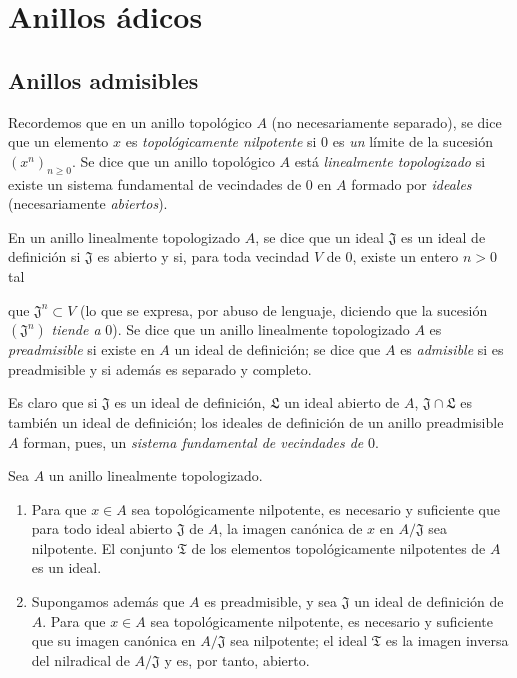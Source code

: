 \section{Anillos ádicos}
\label{section:0.7-fr}

\subsection{Anillos admisibles}
\label{subsection:0.7.1-fr}

\begin{env}[7.1.1]
\label{0.7.1.1-fr}
Recordemos que en un anillo topológico $A$ (no necesariamente separado), se
dice que un elemento $x$ es \emph{topológicamente nilpotente} si $0$ es \emph{un} límite de
la sucesión $(x^n)_{n\geq0}$. Se dice que un anillo topológico $A$ está
\emph{linealmente topologizado} si existe un sistema fundamental de vecindades de
$0$ en $A$ formado por \emph{ideales} (necesariamente \emph{abiertos}).
\end{env}

\begin{definition}[7.1.2]
\label{0.7.1.2-fr}
En un anillo linealmente topologizado $A$, se dice que un ideal $\mathfrak J$
es un \textup{ideal de definición} si $\mathfrak J$ es abierto y si, para toda
vecindad $V$ de $0$, existe un entero $n>0$ tal


que $\mathfrak J^n\subset V$ \textup{(lo que se expresa, por abuso de lenguaje, diciendo
que la sucesión $(\mathfrak J^n)$ \emph{tiende a} $0$)}. Se dice que un anillo linealmente
topologizado $A$ es \emph{preadmisible} si existe en $A$ un ideal de definición;
se dice que $A$ es \emph{admisible} si es preadmisible y si además es
separado y completo.
\end{definition}

Es claro que si $\mathfrak J$ es un ideal de definición, $\mathfrak L$ un
ideal abierto de $A$, $\mathfrak J\cap\mathfrak L$ es también un ideal de
definición; los ideales de definición de un anillo preadmisible $A$ forman,
pues, un \emph{sistema fundamental de vecindades de} $0$.

\begin{lemma}[7.1.3]
\label{0.7.1.3-fr}
Sea $A$ un anillo linealmente topologizado.
\begin{enumerate}
  \item[{\upshape(i)}] Para que $x\in A$ sea topológicamente nilpotente, es
    necesario y suficiente que para todo ideal abierto $\mathfrak J$ de $A$, la imagen
    canónica de $x$ en $A/\mathfrak J$ sea nilpotente. El conjunto
    $\mathfrak T$ de los elementos topológicamente nilpotentes de $A$ es un ideal.
  \item[{\upshape(ii)}] Supongamos además que $A$ es preadmisible, y sea
    $\mathfrak J$ un ideal de definición de $A$. Para que $x\in A$ sea
    topológicamente nilpotente, es necesario y suficiente que su imagen canónica en
    $A/\mathfrak J$ sea nilpotente; el ideal $\mathfrak T$ es la imagen
    inversa del nilradical de $A/\mathfrak J$ y es, por tanto, abierto.
\end{enumerate}
\end{lemma}

